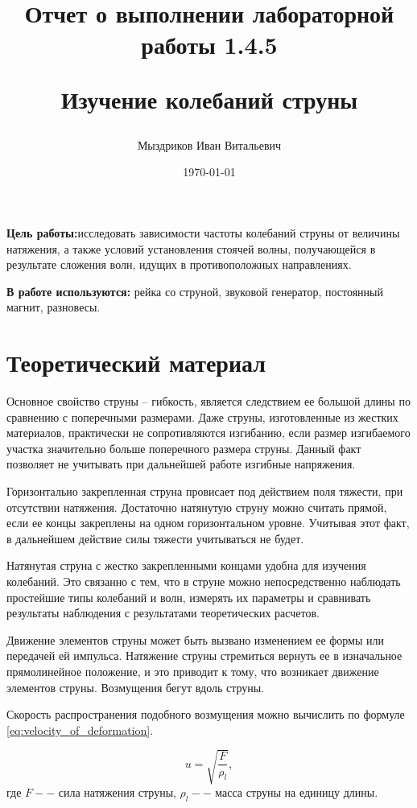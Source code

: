 \documentclass[12pt,a4paper]{article}
\title{
Отчет о выполнении лабораторной работы 1.4.5

Изучение колебаний струны
}
\author{Мыздриков Иван Витальевич}
\date{\today}
\begin{document}
\maketitle
\newpage

\textbf{Цель работы:}исследовать зависимости частоты колебаний струны от величины натяжения, а также условий установления стоячей волны, получающейся в результате сложения волн, идущих в противоположных направлениях.

\textbf{В работе используются:} рейка со струной, звуковой генератор, постоянный магнит, разновесы.

\section{Теоретический материал}
Основное свойство струны -- гибкость, является следствием ее большой длины по сравнению с поперечными размерами. Даже струны, изготовленные из жестких материалов, практически не сопротивляются изгибанию, если размер изгибаемого участка значительно больше поперечного размера струны. Данный факт позволяет не учитывать при дальнейшей работе изгибные напряжения.

Горизонтально закрепленная струна провисает под действием поля тяжести, при отсутствии натяжения. Достаточно натянутую струну можно считать прямой, если ее концы закреплены на одном горизонтальном уровне. Учитывая этот факт, в дальнейшем действие силы тяжести учитываться не будет.

Натянутая струна с жестко закрепленными концами удобна для изучения колебаний. Это связанно с тем, что в струне можно непосредственно наблюдать простейшие типы колебаний и волн, измерять их параметры и сравнивать результаты наблюдения с результатами теоретических расчетов.

Движение элементов струны может быть вызвано изменением ее формы или передачей ей импульса. Натяжение струны стремиться вернуть ее в изначальное прямолинейное положение, и это приводит к тому, что возникает движение элементов струны. Возмущения бегут вдоль струны.

Скорость распространения подобного возмущения можно вычислить по формуле \ref{eq:velocity_of_deformation}.

\begin{equation}
	u = \sqrt{\frac{F}{\rho_{l}}},
	\label{eq:velocity_of_deformation}
\end{equation}
где $F -- $ сила натяжения струны, $\rho_{l} -- $ масса струны на единицу длины.
\end{document}
